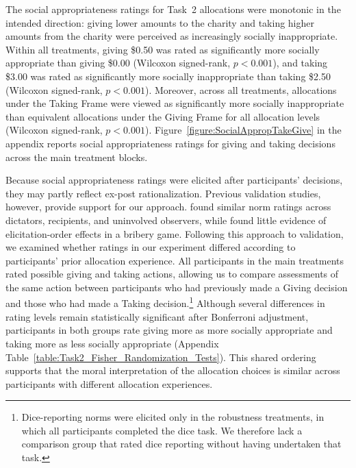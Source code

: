 \documentclass{article}
\begin{document}
\par
The social appropriateness ratings for Task~2 allocations were monotonic in the intended direction: giving lower amounts to the charity and taking higher amounts from the charity were perceived as increasingly socially inappropriate. Within all treatments, giving \$0.50 was rated as significantly more socially appropriate than giving \$0.00 (Wilcoxon signed-rank, $p<0.001$), and taking \$3.00 was rated as significantly more socially inappropriate than taking \$2.50 (Wilcoxon signed-rank, $p<0.001$). Moreover, across all treatments, allocations under the Taking Frame were viewed as significantly more socially inappropriate than equivalent allocations under the Giving Frame for all allocation levels (Wilcoxon signed-rank, $p<0.001$). Figure~\ref{figure:SocialAppropTakeGive} in the appendix reports social appropriateness ratings for giving and taking decisions across the main treatment blocks. 
\par
Because social appropriateness ratings were elicited after participants' decisions, they may partly reflect ex-post rationalization. Previous validation studies, however, provide support for our approach. \textcite{Erkut2015} found similar norm ratings across dictators, recipients, and uninvolved observers, while \textcite{Dadda2016} found little evidence of elicitation-order effects in a bribery game. Following this approach to validation, we examined whether ratings in our experiment differed according to participants' prior allocation experience. All participants in the main treatments rated possible giving and taking actions, allowing us to compare assessments of the same action between participants who had previously made a Giving decision and those who had made a Taking decision.\footnote{Dice-reporting norms were elicited only in the robustness treatments, in which all participants completed the dice task. We therefore lack a comparison group that rated dice reporting without having undertaken that task.} Although several differences in rating levels remain statistically significant after Bonferroni adjustment, participants in both groups rate giving more as more socially appropriate and taking more as less socially appropriate (Appendix Table~\ref{table:Task2_Fisher_Randomization_Tests}). This shared ordering supports that the moral interpretation of the allocation choices is similar across participants with different allocation experiences.
\end{document}
